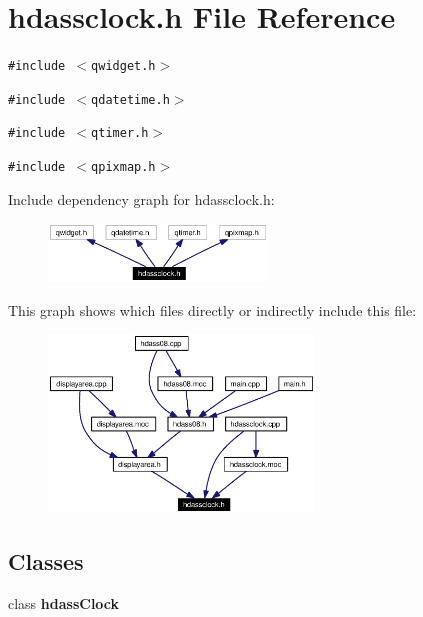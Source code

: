 \section{hdassclock.h File Reference}
\label{hdassclock_8h}


{\tt \#include $<$qwidget.h$>$}\par
{\tt \#include $<$qdatetime.h$>$}\par
{\tt \#include $<$qtimer.h$>$}\par
{\tt \#include $<$qpixmap.h$>$}\par


Include dependency graph for hdassclock.h:\begin{figure}[H]
\begin{center}
\leavevmode
\includegraphics[width=165pt]{hdassclock_8h__incl}
\end{center}
\end{figure}


This graph shows which files directly or indirectly include this file:\begin{figure}[H]
\begin{center}
\leavevmode
\includegraphics[width=200pt]{hdassclock_8h__dep__incl}
\end{center}
\end{figure}
\subsection*{Classes}
\begin{CompactItemize}
\item 
class {\bf hdass\-Clock}
\end{CompactItemize}
